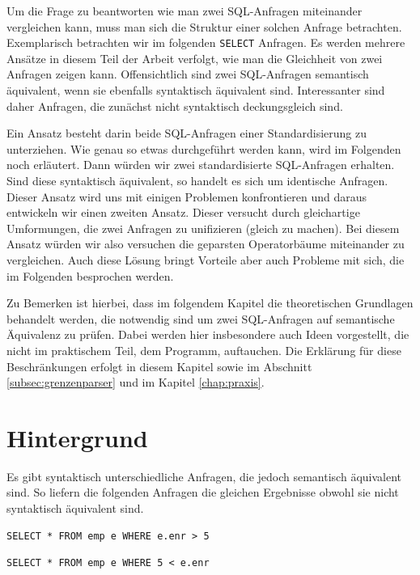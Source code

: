 Um die Frage zu beantworten wie man zwei SQL-Anfragen miteinander vergleichen kann, muss man sich die Struktur einer solchen Anfrage betrachten. Exemplarisch betrachten wir im folgenden \verb|SELECT| Anfragen. Es werden mehrere Ansätze in diesem Teil der Arbeit verfolgt, wie man die Gleichheit von zwei Anfragen zeigen kann. Offensichtlich sind zwei SQL-Anfragen semantisch äquivalent, wenn sie ebenfalls syntaktisch äquivalent sind. Interessanter sind daher Anfragen, die zunächst nicht syntaktisch deckungsgleich sind. 

Ein Ansatz besteht darin beide SQL-Anfragen einer Standardisierung zu unterziehen. Wie genau so etwas durchgeführt werden kann, wird im Folgenden noch erläutert. Dann würden wir zwei standardisierte SQL-Anfragen erhalten. Sind diese syntaktisch äquivalent, so handelt es sich um identische Anfragen. Dieser Ansatz wird uns mit einigen Problemen konfrontieren und daraus entwickeln wir einen zweiten Ansatz. Dieser versucht durch gleichartige Umformungen, die zwei Anfragen zu unifizieren (gleich zu machen). Bei diesem Ansatz würden wir also versuchen die geparsten Operatorbäume miteinander zu vergleichen. Auch diese Lösung bringt Vorteile aber auch Probleme mit sich, die im Folgenden besprochen werden.

Zu Bemerken ist hierbei, dass im folgendem Kapitel die theoretischen Grundlagen behandelt werden, die notwendig sind um zwei SQL-Anfragen auf semantische Äquivalenz zu prüfen. Dabei werden hier insbesondere auch Ideen vorgestellt, die nicht im praktischem Teil, dem Programm, auftauchen. Die Erklärung für diese Beschränkungen erfolgt in diesem Kapitel sowie im Abschnitt \ref{subsec:grenzenparser} und im Kapitel \ref{chap:praxis}.

\section{Hintergrund}

Es gibt syntaktisch unterschiedliche Anfragen, die jedoch semantisch äquivalent sind. So liefern die folgenden Anfragen die gleichen Ergebnisse obwohl sie nicht syntaktisch äquivalent sind.

\begin{verbatim}
SELECT * FROM emp e WHERE e.enr > 5
\end{verbatim}

\begin{verbatim}
SELECT * FROM emp e WHERE 5 < e.enr
\end{verbatim}

